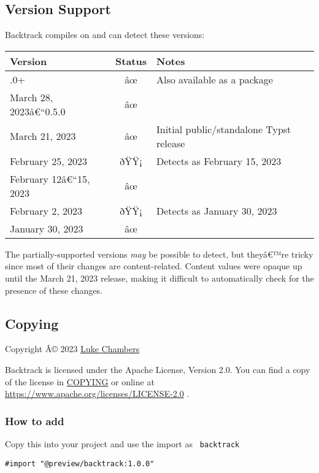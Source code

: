 \subsection{Version Support}\label{version-support}

Backtrack compiles on and can detect these versions:

\begin{longtable}[]{@{}lcl@{}}
\toprule\noalign{}
Version & Status & Notes \\
\midrule\noalign{}
\endhead
\bottomrule\noalign{}
\endlastfoot
0.6.0+ & âœ & Also available as a package \\
March 28, 2023â€``0.5.0 & âœ & \\
March 21, 2023 & âœ & Initial public/standalone Typst release \\
February 25, 2023 & ðŸŸ¡ & Detects as February 15, 2023 \\
February 12â€``15, 2023 & âœ & \\
February 2, 2023 & ðŸŸ¡ & Detects as January 30, 2023 \\
January 30, 2023 & âœ & \\
\end{longtable}

The partially-supported versions \emph{may} be possible to detect, but
theyâ€™re tricky since most of their changes are content-related.
Content values were opaque up until the March 21, 2023 release, making
it difficult to automatically check for the presence of these changes.

\subsection{Copying}\label{copying}

Copyright Â© 2023 \href{https://github.com/TheLukeGuy}{Luke Chambers}

Backtrack is licensed under the Apache License, Version 2.0. You can
find a copy of the license in
\href{https://github.com/typst/packages/raw/main/packages/preview/backtrack/1.0.0/COPYING}{COPYING}
or online at \url{https://www.apache.org/licenses/LICENSE-2.0} .

\subsubsection{How to add}\label{how-to-add}

Copy this into your project and use the import as \texttt{\ backtrack\ }

\begin{verbatim}
#import "@preview/backtrack:1.0.0"
\end{verbatim}

